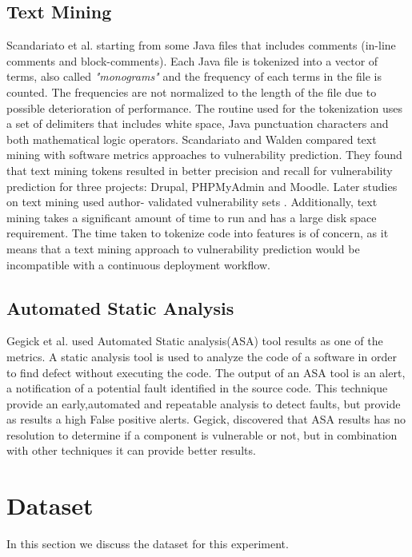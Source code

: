 \documentclass[twocolumn,10pt]{asme2ej}
\begin{document}
\subsection{Text Mining}
Scandariato et al. \cite{Scandariato} starting from some Java files that includes comments (in-line comments and block-comments). Each Java file is tokenized into a vector of terms, also called \textit{"monograms"} and the frequency of each terms in the file is counted. The frequencies are not normalized to the length of the file due to possible deterioration of performance. The routine used for the tokenization uses a set of delimiters that includes white space, Java punctuation characters and both mathematical logic operators.
Scandariato and Walden \cite{Scandariato} \cite{Walden} compared text mining with software metrics approaches to vulnerability prediction. They found that text mining tokens resulted in better precision and recall for vulnerability prediction for three projects: Drupal, PHPMyAdmin and Moodle. Later studies on text mining used author- validated vulnerability sets \cite{Walden}. Additionally, text mining takes a significant amount of time to run and has a large disk space requirement. The time taken to tokenize code into features is of concern, as it means that a text mining approach to vulnerability prediction would be incompatible with a continuous deployment workflow.

\subsection{Automated Static Analysis}
Gegick et al. \cite{Gegick} used Automated Static analysis(ASA) tool results as one of the metrics. A static analysis tool is used to analyze the code of a software in order to find defect without executing the code. The output of an ASA tool is an alert, a notification of a potential fault identified in the source code. This technique provide an early,automated and repeatable analysis to detect faults, but provide as results a high False positive alerts. Gegick, discovered that ASA results has no resolution to determine if a component is vulnerable or not, but in combination with other techniques it can provide better results. 
\section{Dataset}
\label{dataset}
In this section we discuss the dataset for this experiment.\\
\end{document}
